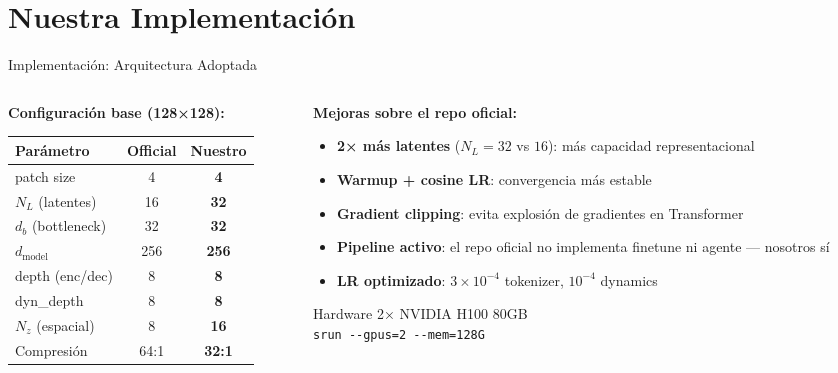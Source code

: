 \documentclass[aspectratio=169, 12pt]{beamer}
\begin{document}
\section{Nuestra Implementación}

\begin{frame}{Implementación: Arquitectura Adoptada}
\begin{columns}[T]
  \begin{column}{0.5\textwidth}
    \textbf{Configuración base (128×128):}

    \vspace{6pt}
    \begin{tabular}{lcc}
      \toprule
      \textbf{Parámetro} & \textbf{Official} & \textbf{Nuestro} \\
      \midrule
      patch size        & 4        & \textbf{4} \\
      $N_L$ (latentes)  & 16       & \textbf{32} \\
      $d_b$ (bottleneck)& 32       & \textbf{32} \\
      $d_\text{model}$  & 256      & \textbf{256} \\
      depth (enc/dec)   & 8        & \textbf{8} \\
      dyn\_depth        & 8        & \textbf{8} \\
      $N_z$ (espacial)  & 8        & \textbf{16} \\
      Compresión        & 64:1     & \textbf{32:1} \\
      \bottomrule
    \end{tabular}
  \end{column}
  \begin{column}{0.48\textwidth}
    \textbf{Mejoras sobre el repo oficial:}
    \begin{itemize}
      \item \textbf{2× más latentes} ($N_L{=}32$ vs $16$): más capacidad representacional
      \item \textbf{Warmup + cosine LR}: convergencia más estable
      \item \textbf{Gradient clipping}: evita explosión de gradientes en Transformer
      \item \textbf{Pipeline activo}: el repo oficial no implementa finetune ni agente — nosotros sí
      \item \textbf{LR optimizado}: $3{\times}10^{-4}$ tokenizer, $10^{-4}$ dynamics
    \end{itemize}

    \vspace{6pt}
    \begin{block}{Hardware}
      2× NVIDIA H100 80GB\\
      \texttt{srun -{}-gpus=2 -{}-mem=128G}
    \end{block}
  \end{column}
\end{columns}
\end{frame}
\end{document}

